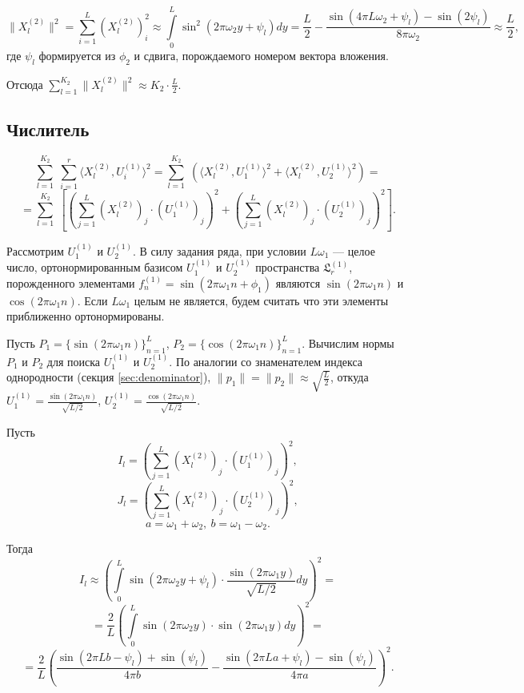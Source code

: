 \documentclass[specialist, substylefile = spbu.rtx,
			   subf, href, 12pt]{disser}
\begin{document}
$$ \|X_l^{(2)}\|^2 = \sum\limits_{i=1}^{L}(X_{l}^{(2)})_i^2 \approx \int\limits_{0}^{L}\sin^2{(2\pi\omega_2 y + \psi_l)}dy = \frac{L}{2} - \frac{\sin(4\pi L\omega_2 + \psi_l) - \sin(2\psi_l)}{8\pi\omega_2} \approx \frac{L}{2}, $$
где $ \psi_l $ формируется из $ \phi_2 $ и сдвига, порождаемого номером вектора вложения.

Отсюда $\sum\limits_{l=1}^{K_2}\|X_l^{(2)}\|^2 \approx K_2\cdot\frac{L}{2}$.


\subsection{Числитель}
$$ \sum\limits_{l=1}^{K_2}\;\sum\limits_{i=1}^{r}\langle X_l^{(2)}, U_i^{(1)}\rangle^2 = 
\sum\limits_{l=1}^{K_2}\;\left ( \langle X_l^{(2)}, U_1^{(1)}\rangle^2 + \langle X_l^{(2)}, U_2^{(1)}\rangle^2 \right ) = $$
$$ =  \sum\limits_{l=1}^{K_2}\; \left [ \left (\sum\limits_{j=1}^{L}(X_{l}^{(2)})_j\cdot (U_{1}^{(1)})_j\right )^2 + \left ( \sum\limits_{j=1}^{L}(X_{l}^{(2)})_j\cdot (U_{2}^{(1)})_j\right )^2 \right ].$$

Рассмотрим $ U_{1}^{(1)} $ и $U_{2}^{(1)} $. В силу задания ряда, при условии $ L\omega_1 $ --- целое число, ортонормированным базисом $ U_{1}^{(1)} $ и $U_{2}^{(1)} $ пространства $ \mathfrak{L}_r^{(1)} $, порожденного элементами $ f_n^{(1)} = \sin(2\pi\omega_1 n + \phi_1) $ являются $ \sin(2\pi\omega_1 n) $ и $ \cos(2\pi\omega_1 n) $. Если $ L\omega_1 $ целым не является, будем считать что эти элементы приближенно ортонормированы.

Пусть $ P_1 = \{\sin(2\pi\omega_1 n)\}_{n=1}^L $, $ P_2 = \{\cos(2\pi\omega_1 n)\}_{n=1}^L $. Вычислим нормы $ P_1 $ и $ P_2 $ для поиска $ U_{1}^{(1)} $ и $U_{2}^{(1)} $. 
По аналогии со знаменателем индекса однородности (секция \ref{sec:denominator}), $ \|p_1\| = \|p_2\| \approx \sqrt{\frac{L}{2}} $, откуда $ U_{1}^{(1)} = \frac{\sin(2\pi\omega_1 n)}{\sqrt{L/2}} $, $ U_{2}^{(1)} = \frac{\cos(2\pi\omega_1 n)}{\sqrt{L/2}} $.

Пусть  
$$ I_l =  \left (\sum\limits_{j=1}^{L}(X_{l}^{(2)})_j\cdot (U_{1}^{(1)})_j\right )^2, $$
$$ J_l =  \left (\sum\limits_{j=1}^{L}(X_{l}^{(2)})_j\cdot (U_{2}^{(1)})_j\right )^2, $$
$$ a = \omega_1 + \omega_2,\ b = \omega_1 - \omega_2. $$

Тогда
$$ I_l \approx \left( \int\limits_{0}^{L}\sin(2\pi\omega_2 y + \psi_l) \cdot \frac{\sin(2\pi\omega_1 y)}{\sqrt{L/2}}dy \right)^2 = $$
$$ = \frac{2}{L} \left(\int\limits_{0}^{L}\sin(2\pi\omega_2 y) \cdot \sin(2\pi\omega_1 y)dy\right )^2 = $$
$$ = \frac{2}{L} 
\left(  
\frac{\sin(2\pi Lb - \psi_l) + \sin(\psi_l)}{4\pi b} - \frac{\sin(2\pi La + \psi_l) - \sin(\psi_l)}{4\pi a}
\right)^2. $$
\end{document}
